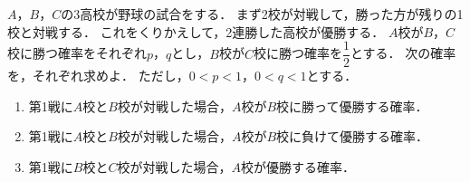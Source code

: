 \documentclass[../../main.tex]{subfiles}
\begin{document}
$A$，$B$，$C$の3高校が野球の試合をする．
まず2校が対戦して，勝った方が残りの1校と対戦する．
これをくりかえして，2連勝した高校が優勝する．
$A$校が$B$，$C$校に勝つ確率をそれぞれ$p$，$q$とし，$B$校が$C$校に勝つ確率を$\displaystyle\dfrac{1}{2}$とする．
次の確率を，それぞれ求めよ．
ただし，$0<p<1$，$0<q<1$とする．
\begin{enumerate}
  \item 第1戦に$A$校と$B$校が対戦した場合，$A$校が$B$校に勝って優勝する確率．
  \item 第1戦に$A$校と$B$校が対戦した場合，$A$校が$B$校に負けて優勝する確率．
  \item 第1戦に$B$校と$C$校が対戦した場合，$A$校が優勝する確率．
\end{enumerate}
\end{document}
